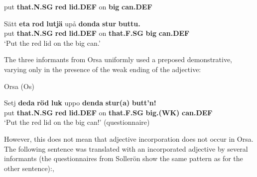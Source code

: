 put  \textbf{that.N.SG} \textbf{red} \textbf{lid.DEF} on  \textbf{big} \textbf{can.DEF}\\

\item 


 \ea\label{}
\gll Sätt  \textbf{eta}\textbf{  rod}\textbf{  lutjä} upå  \textbf{donda}\textbf{  stur}\textbf{  buttu.}\\


put  \textbf{that.N.SG} \textbf{red} \textbf{lid.DEF} on  \textbf{that.F.SG} \textbf{big} \textbf{can.DEF}\\

\glt ‘Put the red lid on the big can.’

\z

The three informants from Orsa uniformly used a preposed demonstrative, varying only in the presence of the weak ending of the adjective: 


\item 

Orsa (Os)



 \ea\label{}
\gll Setj  \textbf{deda} \textbf{röd} \textbf{luk} uppo  \textbf{denda} \textbf{stur(a)} \textbf{butt’n!}\\


put  \textbf{that.N.SG} \textbf{red} \textbf{lid.DEF} on  \textbf{that.F.SG} \textbf{big.(WK)} \textbf{can.DEF}\\

\glt ‘Put the red lid on the big can!’ (questionnaire)

\z

However, this does not mean that adjective incorporation does not occur in Orsa. The following sentence was translated with an incorporated adjective by several informants (the questionnaires from Sollerön show the same pattern as for the other sentence):,

